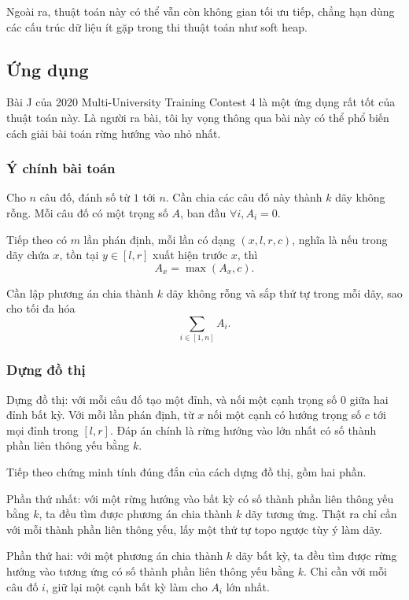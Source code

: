 \documentclass[11pt]{article}
\begin{document}
Ngoài ra, thuật toán này có thể vẫn còn không gian tối ưu tiếp, chẳng hạn dùng
các cấu trúc dữ liệu ít gặp trong thi thuật toán như soft heap.

\subsection{Ứng dụng}

Bài J của 2020 Multi-University Training Contest 4 là một ứng dụng rất tốt của
thuật toán này. Là người ra bài, tôi hy vọng thông qua bài này có thể phổ biến
cách giải bài toán rừng hướng vào nhỏ nhất.

\subsubsection{Ý chính bài toán}

Cho \(n\) câu đố, đánh số từ \(1\) tới \(n\). Cần chia các câu đố này thành
\(k\) dãy không rỗng. Mỗi câu đố có một trọng số \(A\), ban đầu
\(\forall i, A_i=0\).

Tiếp theo có \(m\) lần phán định, mỗi lần có dạng \((x,l,r,c)\), nghĩa là nếu
trong dãy chứa \(x\), tồn tại \(y\in[l,r]\) xuất hiện trước \(x\), thì
\[
A_x=\max(A_x,c).
\]

Cần lập phương án chia thành \(k\) dãy không rỗng và sắp thứ tự trong mỗi dãy,
sao cho tối đa hóa
\[
\sum_{i\in[1,n]}A_i.
\]

\subsubsection{Dựng đồ thị}

Dựng đồ thị: với mỗi câu đố tạo một đỉnh, và nối một cạnh trọng số \(0\) giữa
hai đỉnh bất kỳ. Với mỗi lần phán định, từ \(x\) nối một cạnh có hướng trọng số
\(c\) tới mọi đỉnh trong \([l,r]\). Đáp án chính là rừng hướng vào lớn nhất có
số thành phần liên thông yếu bằng \(k\).

Tiếp theo chứng minh tính đúng đắn của cách dựng đồ thị, gồm hai phần.

Phần thứ nhất: với một rừng hướng vào bất kỳ có số thành phần liên thông yếu
bằng \(k\), ta đều tìm được phương án chia thành \(k\) dãy tương ứng. Thật ra
chỉ cần với mỗi thành phần liên thông yếu, lấy một thứ tự topo ngược tùy ý làm
dãy.

Phần thứ hai: với một phương án chia thành \(k\) dãy bất kỳ, ta đều tìm được
rừng hướng vào tương ứng có số thành phần liên thông yếu bằng \(k\). Chỉ cần
với mỗi câu đố \(i\), giữ lại một cạnh bất kỳ làm cho \(A_i\) lớn nhất.
\end{document}

